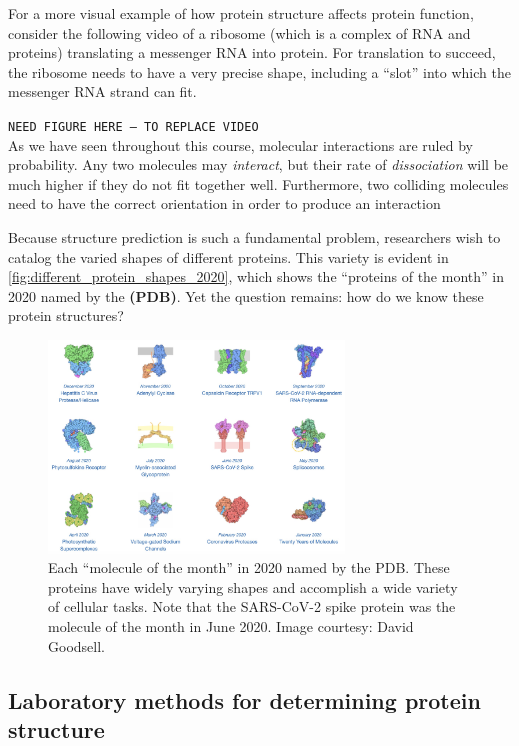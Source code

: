 For a more visual example of how protein structure affects protein function, consider the following video of a ribosome (which is a complex of RNA and proteins) translating a messenger RNA into protein. For translation to succeed, the ribosome needs to have a very precise shape, including a ``slot'' into which the messenger RNA strand can fit.

\texttt{NEED FIGURE HERE -- TO REPLACE VIDEO}\\

As we have seen throughout this course, molecular interactions are ruled by probability. Any two molecules may \textit{interact}, but their rate of \textit{dissociation} will be much higher if they do not fit together well. Furthermore, two colliding molecules need to have the correct orientation in order to produce an interaction

Because structure prediction is such a fundamental problem, researchers wish to catalog the varied shapes of different proteins. This variety is evident in \autoref{fig:different_protein_shapes_2020}, which shows the ``proteins of the month'' in 2020 named by the  \textbf{(PDB)}. Yet the question remains: how do we know these protein structures?

\begin{figure}[h]
	\centering
	\mySfFamily
	\includegraphics[width = 0.7\textwidth]{../images/different_protein_shapes_2020.jpg}
	\caption{Each ``molecule of the month'' in 2020 named by the PDB. These proteins have widely varying shapes and accomplish a wide variety of cellular tasks. Note that the SARS-CoV-2 spike protein was the molecule of the month in June 2020. Image courtesy: David Goodsell.}
	\label{fig:different_protein_shapes_2020}
\end{figure}

\FloatBarrier
{}
\subsection{Laboratory methods for determining protein structure}

